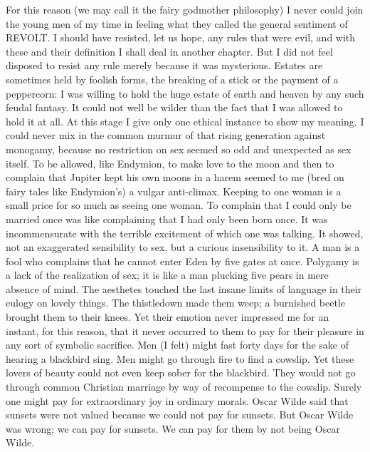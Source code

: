 For this reason (we may call it the fairy godmother philosophy) I never could join the young men of my time in feeling what they called the general sentiment of REVOLT. I should have resisted, let us hope, any rules that were evil, and with these and their definition I shall deal in another chapter. But I did not feel disposed to resist any rule merely because it was mysterious. Estates are sometimes held by foolish forms, the breaking of a stick or the payment of a peppercorn: I was willing to hold the huge estate of earth and heaven by any such feudal fantasy. It could not well be wilder than the fact that I was allowed to hold it at all. At this stage I give only one ethical instance to show my meaning. I could never mix in the common murmur of that rising generation against monogamy, because no restriction on sex seemed so odd and unexpected as sex itself. To be allowed, like Endymion, to make love to the moon and then to complain that Jupiter kept his own moons in a harem seemed to me (bred on fairy tales like Endymion’s) a vulgar anti-climax. Keeping to one woman is a small price for so much as seeing one woman. To complain that I could only be married once was like complaining that I had only been born once. It was incommensurate with the terrible excitement of which one was talking. It showed, not an exaggerated sensibility to sex, but a curious insensibility to it. A man is a fool who complains that he cannot enter Eden by five gates at once. Polygamy is a lack of the realization of sex; it is like a man plucking five pears in mere absence of mind. The aesthetes touched the last insane limits of language in their eulogy on lovely things. The thistledown made them weep; a burnished beetle brought them to their knees. Yet their emotion never impressed me for an instant, for this reason, that it never occurred to them to pay for their pleasure in any sort of symbolic sacrifice. Men (I felt) might fast forty days for the sake of hearing a blackbird sing. Men might go through fire to find a cowslip. Yet these lovers of beauty could not even keep sober for the blackbird. They would not go through common Christian marriage by way of recompense to the cowslip. Surely one might pay for extraordinary joy in ordinary morals. Oscar Wilde said that sunsets were not valued because we could not pay for sunsets. But Oscar Wilde was wrong; we can pay for sunsets. We can pay for them by not being Oscar Wilde.

